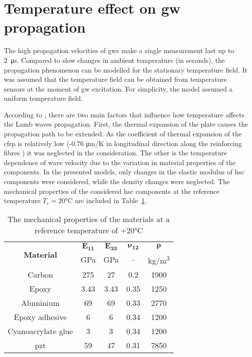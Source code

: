 \section{Temperature effect on \acl{gw} propagation}
\label{sec:temp}
 
The high propagation velocities of \acp{gw} make a single measurement last up to 2~\unit{\micro\second}.
Compared to slow changes in ambient temperature (in seconds), the propagation phenomenon can be modelled for the stationary temperature field.
It was assumed that the temperature field can be obtained from temperature sensors at the moment of \ac{gw} excitation.
For simplicity, the model assumed a uniform temperature field.

According to \cite{lu2005methodology, kijanka2013gpu}, there are two main factors that influence how temperature affects the Lamb waves propagation. First, the thermal expansion of the plate causes the propagation path to be extended. As the coefficient of thermal expansion of the \ac{cfrp} is relatively low (-0.76 \unit[per-mode = symbol]{\micro\meter\per\kelvin} in longitudinal direction along the reinforcing fibres \cite{ahmed2012study}) it was neglected in the consideration.
The other is the temperature dependence of wave velocity due to the variation in material properties of the components.
In the presented models, only changes in the elastic modulus of \ac{hsc} components were considered, while the density changes were neglected.
The mechanical properties of the considered \ac{hsc} components at the reference temperature \(T_r=20\)\unit{\degreeCelsius} are included in Table~\ref{tab:properties}.
\begin{table}[H]
	\small
	\tabcolsep=0.5cm
	\centering
	\caption{\label{tab:properties}The mechanical properties of the materials at a reference temperature of +20\unit{\degreeCelsius}}
	\begin{tabular}{ccccc}\toprule
		\multirow{2}{*}{\textbf{Material}} & $\boldsymbol{E_{11}}$ & $\boldsymbol{E_{33}}$ & $\boldsymbol{\nu_{12}}$ & $\boldsymbol{\rho}$ \\ & \unit{\giga\pascal} & \unit{\giga\pascal} & -- & \unit[per-mode = symbol]{\kilogram\per\cubic\meter}\\
		\midrule
		Carbon & 275 & 27 & 0.2 & 1900\\
		Epoxy & 3.43 & 3.43 & 0.35 & 1250\\
		Aluminium & 69 & 69 & 0.33 & 2770\\
		Epoxy adhesive & 6 & 6 & 0.34 & 1200\\
		Cyanoacrylate glue & 3 & 3 & 0.34 & 1200\\	
		\ac{pzt} &  59 & 47 & 0.31 & 7850\\
		\bottomrule
	\end{tabular}
\end{table}
